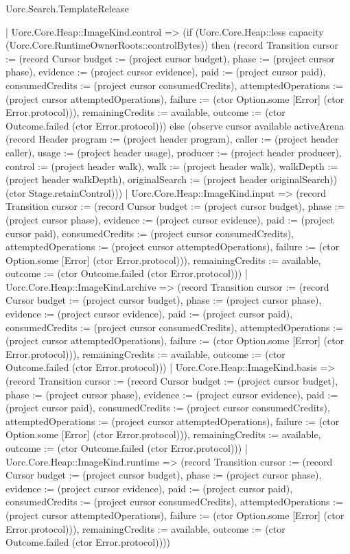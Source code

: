 \begin{lexlean}{Uorc.Search.TemplateRelease}
\begin{semanticmodule}
{        | Uorc.Core.Heap::ImageKind.control => (if (Uorc.Core.Heap::less capacity (Uorc.Core.RuntimeOwnerRoots::controlBytes)) then (record Transition {cursor := (record Cursor {budget := (project cursor budget), phase := (project cursor phase), evidence := (project cursor evidence), paid := (project cursor paid), consumedCredits := (project cursor consumedCredits), attemptedOperations := (project cursor attemptedOperations), failure := (ctor Option.some [Error] (ctor Error.protocol))}), remainingCredits := available, outcome := (ctor Outcome.failed (ctor Error.protocol))}) else (observe cursor available activeArena (record Header {program := (project header program), caller := (project header caller), usage := (project header usage), producer := (project header producer), control := (project header walk), walk := (project header walk), walkDepth := (project header walkDepth), originalSearch := (project header originalSearch)}) (ctor Stage.retainControl)))
        | Uorc.Core.Heap::ImageKind.input => (record Transition {cursor := (record Cursor {budget := (project cursor budget), phase := (project cursor phase), evidence := (project cursor evidence), paid := (project cursor paid), consumedCredits := (project cursor consumedCredits), attemptedOperations := (project cursor attemptedOperations), failure := (ctor Option.some [Error] (ctor Error.protocol))}), remainingCredits := available, outcome := (ctor Outcome.failed (ctor Error.protocol))})
        | Uorc.Core.Heap::ImageKind.archive => (record Transition {cursor := (record Cursor {budget := (project cursor budget), phase := (project cursor phase), evidence := (project cursor evidence), paid := (project cursor paid), consumedCredits := (project cursor consumedCredits), attemptedOperations := (project cursor attemptedOperations), failure := (ctor Option.some [Error] (ctor Error.protocol))}), remainingCredits := available, outcome := (ctor Outcome.failed (ctor Error.protocol))})
        | Uorc.Core.Heap::ImageKind.basis => (record Transition {cursor := (record Cursor {budget := (project cursor budget), phase := (project cursor phase), evidence := (project cursor evidence), paid := (project cursor paid), consumedCredits := (project cursor consumedCredits), attemptedOperations := (project cursor attemptedOperations), failure := (ctor Option.some [Error] (ctor Error.protocol))}), remainingCredits := available, outcome := (ctor Outcome.failed (ctor Error.protocol))})
        | Uorc.Core.Heap::ImageKind.runtime => (record Transition {cursor := (record Cursor {budget := (project cursor budget), phase := (project cursor phase), evidence := (project cursor evidence), paid := (project cursor paid), consumedCredits := (project cursor consumedCredits), attemptedOperations := (project cursor attemptedOperations), failure := (ctor Option.some [Error] (ctor Error.protocol))}), remainingCredits := available, outcome := (ctor Outcome.failed (ctor Error.protocol))}))
}
\end{semanticmodule}
\end{lexlean}
